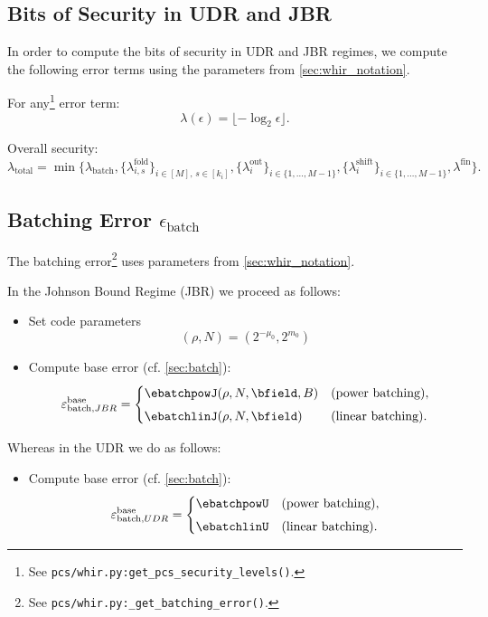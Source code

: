 \subsection{Bits of Security in UDR and JBR}

In order to compute the bits of security in UDR and JBR regimes, we compute the following error terms using the parameters from \cref{sec:whir_notation}.

For any\footnote{See \texttt{pcs/whir.py:get\_pcs\_security\_levels()}.} error term:
\[
  \lambda(\epsilon)
  = \lfloor-\log_2\epsilon\rfloor.
\]

Overall security:
\[
  \lambda_{\mathrm{total}}
    = \min\{
      \lambda_{\mathrm{batch}},
      \{\lambda^{\mathrm{fold}}_{i,s}\}_{i\in [M],\,s\in[k_i]},
      \{\lambda^{\mathrm{out}}_i\}_{i\in \{1,\ldots,M-1\}},
      \{\lambda^{\mathrm{shift}}_i\}_{i\in \{1,\ldots,M-1\}},
      \lambda^{\mathrm{fin}}
    \}.
\]

\subsection{Batching Error \(\epsilon_{\mathrm{batch}}\)}

The batching error\footnote{See \texttt{pcs/whir.py:\_get\_batching\_error()}.} uses parameters from \cref{sec:whir_notation}.

In the Johnson Bound Regime (JBR) we proceed as follows:
\begin{itemize}
    \item Set code parameters $$
    (\rho,N)= \left(2^{-\mu_0}, 2^{m_0}\right)
    $$
    \item Compute base error (cf. \cref{sec:batch}):
\[
\varepsilon_{\mathrm{batch}, JBR}^{\text{base}} =
\begin{cases}
   \ebatchpowJ(\rho,N,\bfield,B) & \text{(power batching)}, \\[4pt]
  \ebatchlinJ(\rho,N,\bfield)& \text{(linear batching)}.
\end{cases}
\]
\end{itemize}
Whereas in the UDR we do as follows:
\begin{itemize}
    \item Compute base error (cf. \cref{sec:batch}):
\[
\varepsilon_{\mathrm{batch}, UDR}^{\text{base}} =
\begin{cases}
   \ebatchpowU & \text{(power batching)}, \\[4pt]
  \ebatchlinU& \text{(linear batching)}.
\end{cases}
\]
\end{itemize}

